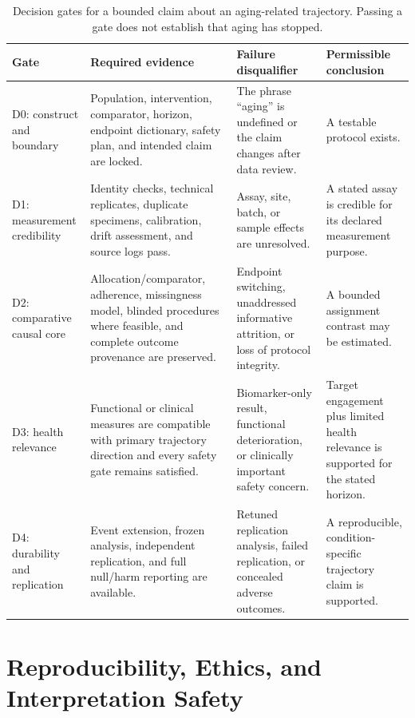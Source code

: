 \documentclass[10pt,conference]{IEEEtran}
\begin{document}
\begin{table}[!t]
\caption{Decision gates for a bounded claim about an aging-related trajectory. Passing a gate does not establish that aging has stopped.}
\label{tab:decision-gates}
\centering
\footnotesize
\begin{tabular}{@{}p{}p{}p{}p{}@{}}
\toprule
Gate & Required evidence & Failure disqualifier & Permissible conclusion \\
\midrule
D0: construct and boundary & Population, intervention, comparator, horizon, endpoint dictionary, safety plan, and intended claim are locked. & The phrase ``aging'' is undefined or the claim changes after data review. & A testable protocol exists. \\
D1: measurement credibility & Identity checks, technical replicates, duplicate specimens, calibration, drift assessment, and source logs pass. & Assay, site, batch, or sample effects are unresolved. & A stated assay is credible for its declared measurement purpose. \\
D2: comparative causal core & Allocation/comparator, adherence, missingness model, blinded procedures where feasible, and complete outcome provenance are preserved. & Endpoint switching, unaddressed informative attrition, or loss of protocol integrity. & A bounded assignment contrast may be estimated. \\
D3: health relevance & Functional or clinical measures are compatible with primary trajectory direction and every safety gate remains satisfied. & Biomarker-only result, functional deterioration, or clinically important safety concern. & Target engagement plus limited health relevance is supported for the stated horizon. \\
D4: durability and replication & Event extension, frozen analysis, independent replication, and full null/harm reporting are available. & Retuned replication analysis, failed replication, or concealed adverse outcomes. & A reproducible, condition-specific trajectory claim is supported. \\
\bottomrule
\end{tabular}
\end{table}

\section{Reproducibility, Ethics, and Interpretation Safety}
\label{sec:reproducibility}
\end{document}
